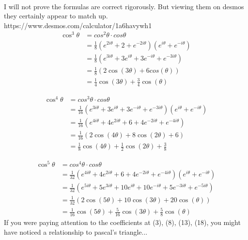 \documentclass[12pt]{article}
\begin{document}
\\
I will not prove the formulas are correct rigorously. But viewing them on
desmos they certainly appear to match up. 
\\
https://www.desmos.com/calculator/1a6havywh1
\newpage
\begin{align}
\cos^3\theta &= cos^2\theta \cdot cos\theta
\\
&= \frac{1}{8}(e^{2i\theta} + 2 + e^{-2i\theta})(e^{i\theta} + e^{-i\theta})
\\
&= \frac{1}{8}(e^{3i\theta} + 3e^{i\theta} + 3e^{-i\theta} + e^{-3i\theta})
\\
&= \frac{1}{8}(2\cos(3\theta) + 6cos(\theta))
\\
&= \frac{1}{4}\cos(3\theta) + \frac{3}{4}\cos(\theta)
\end{align}

\begin{align}
\cos^4\theta &= cos^3\theta \cdot cos\theta
\\
&= \frac{1}{16}(e^{3i\theta} + 3e^{i\theta} + 3e^{-i\theta} + e^{-3i\theta})(e^{i\theta} + e^{-i\theta})
\\
&= \frac{1}{16}(e^{4i\theta} + 4e^{2i\theta} + 6 + 4e^{-2i\theta} + e^{-4i\theta})
\\
&= \frac{1}{16}(2\cos(4\theta) + 8\cos(2\theta) + 6)
\\
&= \frac{1}{8}\cos(4\theta) + \frac{1}{2}\cos(2\theta) + \frac{3}{8}
\end{align}

\begin{align}
\cos^5\theta &= cos^4\theta \cdot cos\theta
\\
&= \frac{1}{32}(e^{4i\theta} + 4e^{2i\theta} + 6 + 4e^{-2i\theta} + e^{-4i\theta})(e^{i\theta} + e^{-i\theta})
\\
&= \frac{1}{32}(e^{5i\theta} + 5e^{3i\theta} + 10e^{i\theta} + 10e^{-i\theta} + 5e^{-3i\theta} + e^{-5i\theta})
\\
&= \frac{1}{32}(2\cos(5\theta) + 10\cos(3\theta) + 20\cos(\theta))
\\
&= \frac{1}{16}\cos(5\theta) + \frac{5}{16}\cos(3\theta) + \frac{5}{8}\cos(\theta)
\end{align}
If you were paying attention to the coefficients at (3), (8), (13), (18), you might have noticed a relationship to pascal's triangle...

\newpage
\end{document}
